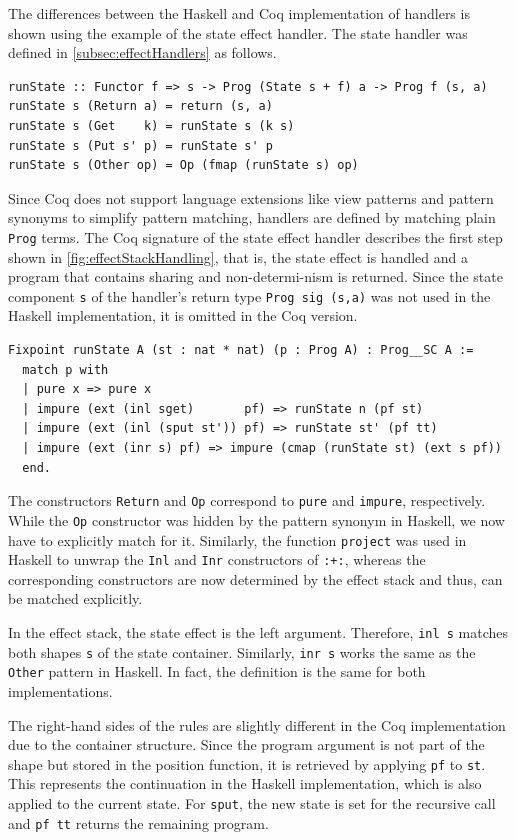 \documentclass[a4paper, 11pt, fleqn, twoside, abstract=on]{scrreprt}
\newcommand{\hinl}[1]{\texttt{#1}}
\newcommand{\cinl}[1]{\texttt{#1}}
\begin{document}
The differences between the Haskell and Coq implementation of handlers is shown using the example of the state effect handler.
The state handler was defined in \autoref{subsec:effectHandlers} as follows.

\begin{verbatim}
runState :: Functor f => s -> Prog (State s + f) a -> Prog f (s, a)
runState s (Return a) = return (s, a)
runState s (Get    k) = runState s (k s)
runState s (Put s' p) = runState s' p
runState s (Other op) = Op (fmap (runState s) op)
\end{verbatim}

Since Coq does not support language extensions like view patterns and pattern synonyms to simplify pattern matching, handlers are defined by matching plain \cinl{Prog} terms.
The Coq signature of the state effect handler describes the first step shown in \autoref{fig:effectStackHandling}, that is, the state effect is handled and a program that contains sharing and non-determi-nism is returned.
Since the state component \hinl{s} of the handler's return type \hinl{Prog sig (s,a)} was not used in the Haskell implementation, it is omitted in the Coq version.

\begin{verbatim}
Fixpoint runState A (st : nat * nat) (p : Prog A) : Prog__SC A :=
  match p with
  | pure x => pure x
  | impure (ext (inl sget)       pf) => runState n (pf st)
  | impure (ext (inl (sput st')) pf) => runState st' (pf tt)
  | impure (ext (inr s) pf) => impure (cmap (runState st) (ext s pf))
  end.
\end{verbatim}
\noindent
The constructors \hinl{Return} and \hinl{Op} correspond to \cinl{pure} and \cinl{impure}, respectively.
While the \hinl{Op} constructor was hidden by the pattern synonym in Haskell, we now have to explicitly match for it.
Similarly, the function \hinl{project} was used in Haskell to unwrap the \hinl{Inl} and \hinl{Inr} constructors of \hinl{:+:}, whereas the corresponding constructors are now determined by the effect stack and thus, can be matched explicitly.

In the effect stack, the state effect is the left argument.
Therefore, \cinl{inl s} matches both shapes \cinl{s} of the state container.
Similarly, \cinl{inr s} works the same as the \hinl{Other} pattern in Haskell.
In fact, the definition is the same for both implementations.

The right-hand sides of the rules are slightly different in the Coq implementation due to the container structure.
Since the program argument is not part of the shape but stored in the position function, it is retrieved by applying \cinl{pf} to \cinl{st}.
This represents the continuation in the Haskell implementation, which is also applied to the current state.
For \cinl{sput}, the new state is set for the recursive call and \cinl{pf tt} returns the remaining program.
\end{document}
